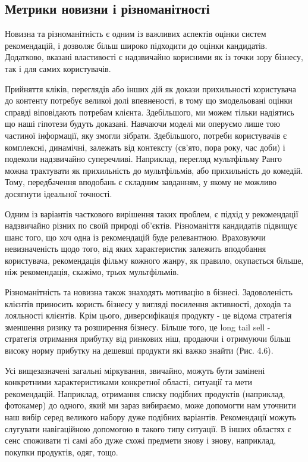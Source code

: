 \subsection{Метрики новизни і різноманітності}

Новизна та різноманітність є одним із важливих аспектів оцінки систем рекомендацій, і дозволяє більш широко підходити до оцінки кандидатів. Додатково, вказані властивості є надзвичайно корисними як із точки зору бізнесу, так і для самих користувачів. 

Прийняття кліків, переглядів або інших дій як докази прихильності користувача до контенту потребує великої долі впевненості, в тому що змодельовані оцінки справді віповідають потребам клієнта. Здебільшого, ми можем тільки надіятись що наші гіпотези будуть доказані.
Навчаючи моделі ми оперуємо лише тою частиної інформації, яку змогли зібрати.
Здебільшого, потреби користувачів є комплексні, динамічні, залежать від контексту (св’ято, пора року, час доби) і подеколи надзвичайно суперечливі.
Наприклад, перегляд мультфільму Ранго можна трактувати як прихильність до мультфільмів, або прихильність до комедій. Тому, передбачення вподобань є складним завданням, у якому не можливо досягнути ідеальної точності.

Одним із варіантів часткового вирішення таких проблем, є підхід у рекомендації надзвичайно різних по своїй природі об’єктів. Різноманіття кандидатів підвищує шанс того, що хоч одна із рекомендацій буде релевантною.
Враховуючи невизначеність щодо того, від яких характеристик залежить вподобання користувача, рекомендація фільму кожного жанру, як правило, окупається більше, ніж рекомендація, скажімо, трьох мультфільмів.

Різноманітність та новизна також знаходять мотивацію в бізнесі. Задоволеність клієнтів приносить користь бізнесу у вигляді посилення активності, доходів та лояльності клієнтів.
Крім цього, диверсифікація продукту - це відома стратегія зменшення ризику та розширення бізнесу. Більше того, це long tail sell - стратегія отримання прибутку від ринкових ніш, продаючи і отримуючи більш високу норму прибутку на дешевші продукти які важко знайти (Рис. 4.6).

Усі вищезазначені загальні міркування, звичайно, можуть бути замінені конкретними характеристиками конкретної області, ситуації та мети рекомендацій.
Наприклад, отримання списку подібних продуктів (наприклад, фотокамер) до одного, який ми зараз вибираємо, може допомогти нам уточнити наш вибір серед великого набору дуже подібних варіантів. Рекомендації можуть слугувати навігаційною допомогою в такого типу ситуації.
В інших областях є сенс споживати ті самі або дуже схожі предмети знову і знову, наприклад, покупки продуктів, одяг, тощо.

